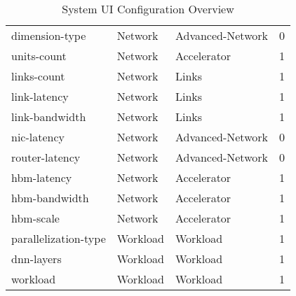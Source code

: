 \begin{table}[ht]
{\begin{tabular}{|l|l|l|l|}
            dimension-type                & Network                     & Advanced-Network     & 0                   \\
            units-count                   & Network                     & Accelerator          & 1                   \\
            links-count                   & Network                     & Links                & 1                   \\
            link-latency                  & Network                     & Links                & 1                   \\
            link-bandwidth                & Network                     & Links                & 1                   \\
            nic-latency                   & Network                     & Advanced-Network     & 0                   \\
            router-latency                & Network                     & Advanced-Network     & 0                   \\
            hbm-latency                   & Network                     & Accelerator          & 1                   \\
            hbm-bandwidth                 & Network                     & Accelerator          & 1                   \\
            hbm-scale                     & Network                     & Accelerator          & 1                   \\
            parallelization-type          & Workload                    & Workload             & 1                   \\
            dnn-layers                    & Workload                    & Workload             & 1                   \\
            workload                      & Workload                    & Workload             & 1                   \\
            \hline
        \end{tabular}
    }
    \caption{System UI Configuration Overview}
    \label{tab:system_ui}
\end{table}
